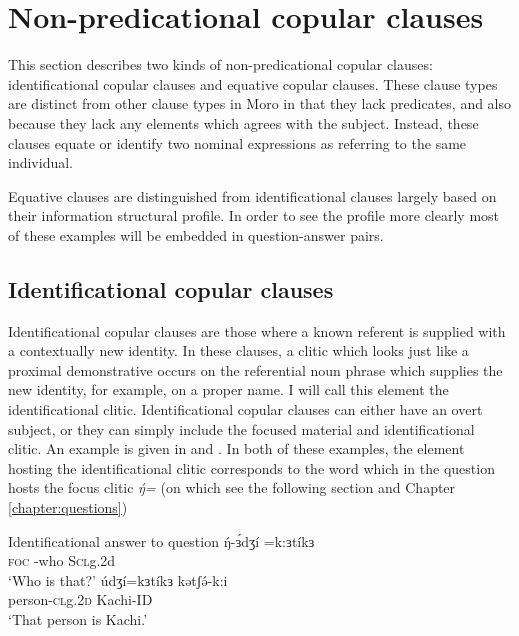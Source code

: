 \section{Non-predicational copular clauses}\label{sec:ch11:instrumental}

This section describes two kinds of non-predicational copular clauses: identificational copular clauses and equative copular clauses. These clause types are distinct from other clause types in Moro in that they lack predicates, and also because they lack any elements which agrees with the subject. Instead, these clauses equate or identify two nominal expressions as referring to the same individual. 

Equative clauses are distinguished from identificational clauses largely based on their information structural profile. In order to see the profile more clearly most of these examples will be embedded in question-answer pairs.

		
\subsection{Identificational copular clauses}


Identificational copular clauses are those where a known referent is supplied with a contextually new identity. In these clauses, a clitic which looks just like a proximal demonstrative occurs on the referential noun phrase which supplies the new identity, for example, on a proper name. I will call this element the identificational clitic. Identificational copular clauses can either have an overt subject, or they can simply include the focused material and identificational clitic. An example is given in  and . In both of these examples, the element hosting the identificational clitic corresponds to the word which in the question hosts the focus clitic \textit{ŋ́=} (on which see the following section and Chapter \ref{chapter:questions})

\ea Identificational answer to question \label{ex:copular:id1}
 	 \gll  	ŋ́-ɜ́dʒí 	=k:ɜtíkɜ	\\			
						 \textsc{foc} -who	   			S\textsc{cl}g.2d		\\
			\glt 	‘Who is that?’ 
	 \gll 	 	údʒí=kɜtíkɜ 		kətʃə́-k:i 	\\
		     		person-\textsc{cl}g.\textsc{2d} 		Kachi-ID		\\
		    \glt   ‘That person is Kachi.’
\z 

